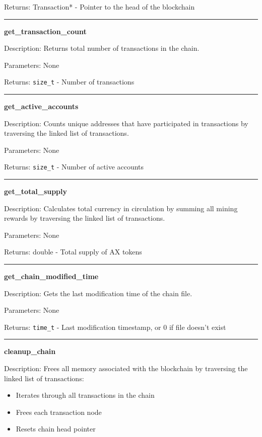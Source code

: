 \documentclass[12pt]{article}
\begin{document}
Returns: Transaction* - Pointer to the head of the blockchain

\vspace{1em}
\hrule
\vspace{1em}

\textbf{get\_transaction\_count}

Description: Returns total number of transactions in the chain.

Parameters: None

Returns: \texttt{size\_t} - Number of transactions

\vspace{1em}
\hrule
\vspace{1em}

\textbf{get\_active\_accounts}

Description: Counts unique addresses that have participated in transactions by traversing the linked list of transactions.

Parameters: None

Returns: \texttt{size\_t} - Number of active accounts

\vspace{1em}
\hrule
\vspace{1em}

\textbf{get\_total\_supply}

Description: Calculates total currency in circulation by summing all mining rewards by traversing the linked list of transactions.

Parameters: None

Returns: double - Total supply of AX tokens

\vspace{1em}
\hrule
\vspace{1em}

\textbf{get\_chain\_modified\_time}

Description: Gets the last modification time of the chain file.

Parameters: None

Returns: \texttt{time\_t} - Last modification timestamp, or 0 if file doesn't exist

\vspace{1em}
\hrule
\vspace{1em}

\textbf{cleanup\_chain}

Description: Frees all memory associated with the blockchain by traversing the linked list of transactions:
\begin{itemize}
\item Iterates through all transactions in the chain
\item Frees each transaction node
\item Resets chain head pointer
\end{itemize}
\end{document}
